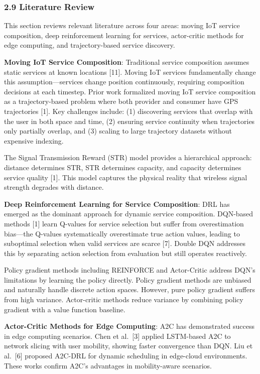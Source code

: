 \hypertarget{literature-review}{%
	\subsubsection{2.9 Literature Review}\label{literature-review}}

This section reviews relevant literature across four areas: moving IoT
service composition, deep reinforcement learning for services,
actor-critic methods for edge computing, and trajectory-based service
discovery.

\textbf{Moving IoT Service Composition}: Traditional service composition
assumes static services at known locations {[}11{]}. Moving IoT services
fundamentally change this assumption---services change position
continuously, requiring composition decisions at each timestep. Prior
work formalized moving IoT service composition as a trajectory-based
problem where both provider and consumer have GPS trajectories {[}1{]}.
Key challenges include: (1) discovering services that overlap with the
user in both space and time, (2) ensuring service continuity when
trajectories only partially overlap, and (3) scaling to large trajectory
datasets without expensive indexing.

The Signal Transmission Reward (STR) model provides a hierarchical
approach: distance determines STR, STR determines capacity, and capacity
determines service quality {[}1{]}. This model captures the physical
reality that wireless signal strength degrades with distance.

\textbf{Deep Reinforcement Learning for Service Composition}: DRL has
emerged as the dominant approach for dynamic service composition.
DQN-based methods {[}1{]} learn Q-values for service selection but
suffer from overestimation bias---the Q-values systematically
overestimate true action values, leading to suboptimal selection when
valid services are scarce {[}7{]}. Double DQN addresses this by
separating action selection from evaluation but still operates
reactively.

Policy gradient methods including REINFORCE and Actor-Critic address
DQN's limitations by learning the policy directly. Policy gradient
methods are unbiased and naturally handle discrete action spaces.
However, pure policy gradient suffers from high variance. Actor-critic
methods reduce variance by combining policy gradient with a value
function baseline.

\textbf{Actor-Critic Methods for Edge Computing}: A2C has demonstrated
success in edge computing scenarios. Chen et al.~{[}3{]} applied
LSTM-based A2C to network slicing with user mobility, showing faster
convergence than DQN. Liu et al.~{[}6{]} proposed A2C-DRL for dynamic
scheduling in edge-cloud environments. These works confirm A2C's
advantages in mobility-aware scenarios.

